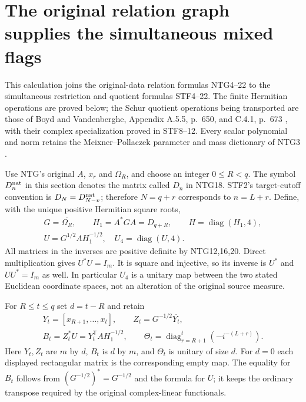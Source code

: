 \documentclass[11pt,a4paper]{article}
\begin{document}
\label{MTBUILD:SIMULTANEOUS_TAIL_FLAGS:end}

\clearpage
\label{MTBUILD:NATIVE_GRAPH_FLAG_INTERTWINER:start}
\begingroup
\section{The original relation graph supplies the simultaneous mixed flags}
\label{sec:NFI}

This calculation joins the original-data relation formulas NTG4--22 to
the simultaneous restriction and quotient formulas STF4--22. The finite
Hermitian operations are proved below; the Schur quotient operations
being transported are those of Boyd and Vandenberghe,
Appendix A.5.5, p.~650, and C.4.1, p.~673
\cite{human:boyd-vandenberghe}, with their complex specialization
proved in STF8--12. Every scalar polynomial and norm retains the
Meixner--Pollaczek parameter and mass dictionary of NTG3
\cite[eqs.~(18.19.8)--(18.19.9), (18.22.8)]{human:dlmf18}.

Use NTG's original $A$, $x_r$ and $\Omega_R$, and choose an integer
$0\le R<q$. The symbol $D^{\rm nat}_n$ in this section denotes the
matrix called $D_n$ in NTG18. STF2's target-cutoff convention is
$D_N=D^{\rm nat}_{N-v}$; therefore $N=q+r$ corresponds to $n=L+r$.
Define, with the unique positive Hermitian square roots,
\[
\begin{gathered}
 G=\overline{\Omega_R},\qquad H_1=A^*GA=D_{q+R},\qquad
 H=\operatorname{diag}(H_1,4),\\
 U=G^{1/2}AH_1^{-1/2},\quad U_4=\operatorname{diag}(U,4).
\end{gathered}
                                                               \tag{NFI1}
\]
All matrices in the inverses are positive definite by NTG12,16,20.
Direct multiplication gives $U^*U=I_m$. It is square and injective,
so its inverse is $U^*$ and $UU^*=I_m$ as well. In particular
$U_4$ is a unitary map between the two stated Euclidean coordinate
spaces, not an alteration of the original source measure.

For $R\le t\le q$ set $d=t-R$ and retain
\[
\begin{gathered}
 Y_t=[x_{R+1},\ldots,x_t],\qquad
 Z_t=G^{-1/2}\overline{Y_t},\\
 B_t=Z_t^*U=Y_t^{\mathsf T}AH_1^{-1/2},\qquad
 \Theta_t=\operatorname{diag}_{r=R+1}^{t}(-i^{-(L+r)}).
\end{gathered}
                                                               \tag{NFI2}
\]
Here $Y_t,Z_t$ are $m$ by $d$, $B_t$ is $d$ by $m$, and
$\Theta_t$ is unitary of size $d$. For $d=0$ each displayed
rectangular matrix is the corresponding empty map. The equality
for $B_t$ follows from $(G^{-1/2})^*=G^{-1/2}$ and the formula
for $U$; it keeps the ordinary transpose required by the original
complex-linear functionals.
\end{document}
